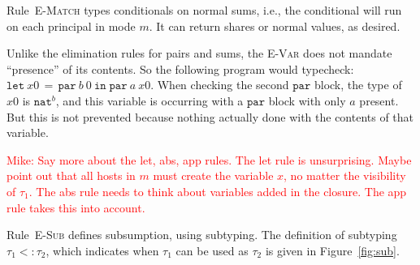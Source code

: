\documentclass[10pt]{article}
\newcommand{\rulelab}[1]{{\small \textsc{#1}}}
\newcommand{\kw}[1]{\ensuremath{\mathtt{#1}}}
\newcommand{\tnat}{\ensuremath{\mathtt{nat}}}
\newcommand{\elet}[3]{\ensuremath{\kw{let}~#1\, =\, #2~\kw{in}\;{#3}}}
\newcommand{\epar}[2]{\ensuremath{\kw{par}~{#1}~{#2}}}
\newcommand{\econd}[3]{\ensuremath{\kw{match}~{#1}~\kw{with}~x.{#2} \mid x.{#3}}}
\newcommand{\subtype}{\ensuremath{<:}}
\newcommand{\issub}[2]{{#1} \subtype {#2}}
\newcommand{\mwh}[1]{\textcolor{red}{Mike: #1}}
\begin{document}
Rule~\rulelab{E-Match} types conditionals on normal sums, i.e., the
conditional will run on each principal in mode $m$. It can return
shares or normal values, as desired. 

Unlike the elimination rules for pairs and sums, the \rulelab{E-Var}
does not mandate ``presence'' of its contents. So the following
program would typecheck: $\elet{x0}{\epar{b}0}{\epar{a}{x0}}$. When
checking the second $\kw{par}$ block, the type of $x0$ is $\tnat^{b}$,
and this variable is occurring with a $\kw{par}$ block with only $a$
present. But this is not prevented because nothing actually done with
the contents of that variable.

\mwh{Say more about the let, abs, app rules. The let rule is
  unsurprising. Maybe point out that all hosts in $m$ must create the
  variable $x$, no matter the visibility of $\tau_1$. The abs rule
  needs to think about variables added in the closure. The app rule
  takes this into account.}

Rule~\rulelab{E-Sub} defines subsumption, using subtyping.  The
definition of subtyping $\issub{\tau_1}{\tau_2}$, which indicates when
$\tau_1$ can be used as $\tau_2$ is given in Figure~\ref{fig:sub}.

\end{document}
